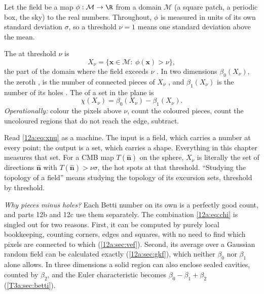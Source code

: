 Let the field be a map $\phi:\mathcal M\to\R$ from a domain $\mathcal M$ (a square patch, a periodic box,
the sky) to the real numbers. Throughout, $\phi$ is measured in units of its own standard deviation
$\sigma$, so a threshold $\nu=1$ means one standard deviation above the mean.

\begin{workdef}
The  at threshold $\nu$ is
\begin{equation}
  X_\nu=\{\bm x\in\mathcal M:\ \phi(\bm x)>\nu\},
  \label{12a:eq:xnu}
\end{equation}
the part of the domain where the field exceeds $\nu$ . In two dimensions $\beta_0(X_\nu)$, the zeroth , is the number of
connected pieces of $X_\nu$ , and
$\beta_1(X_\nu)$ is the number of its holes . The  of a set in the plane is
\begin{equation}
  \chi(X_\nu)=\beta_0(X_\nu)-\beta_1(X_\nu) .
  \label{12a:eq:chi}
\end{equation}
\emph{Operationally:} colour the pixels above $\nu$, count the coloured pieces, count the uncoloured
regions that do not reach the edge, subtract.
\end{workdef}

Read \eqref{12a:eq:xnu} as a machine. The input is a field, which carries a number at every point; the
output is a set, which carries a shape. Everything in this chapter measures that set. For a CMB map
$T(\hat{\bm n})$ on the sphere, $X_\nu$ is literally the set of directions $\hat{\bm n}$ with
$T(\hat{\bm n})>\nu\sigma$, the hot spots at that threshold. ``Studying the topology of a field'' means
studying the topology of its excursion sets, threshold by threshold.

\emph{Why pieces minus holes?} Each Betti number on its own is a perfectly good count, and parts 12b
and 12c use them separately. The combination \eqref{12a:eq:chi} is singled out for two
reasons. First, it can be computed by purely local bookkeeping, counting corners, edges and squares, with no
need to find which pixels are connected to which (\cref{12a:sec:vef}). Second, its average over a Gaussian
random field can be calculated exactly (\cref{12a:sec:gkf}), which neither $\beta_0$ nor $\beta_1$ alone
allows. In three dimensions a solid region can also enclose sealed cavities, counted by $\beta_2$, and the
Euler characteristic becomes $\beta_0-\beta_1+\beta_2$ (\cref{T3a:sec:betti}).

